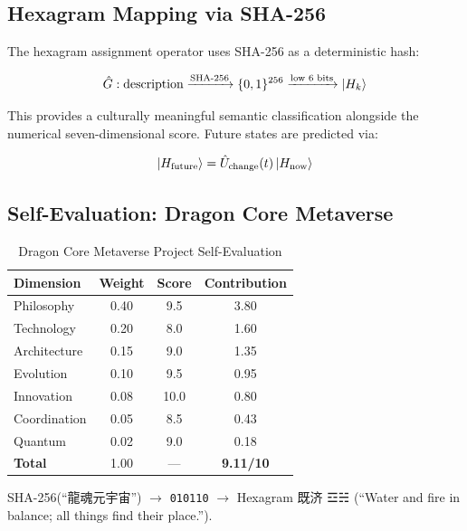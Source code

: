 \documentclass[conference]{IEEEtran}
\begin{document}
\subsection{Hexagram Mapping via SHA-256}

The hexagram assignment operator uses SHA-256 as
a deterministic hash:

\begin{equation}
  \hat{G} : \text{description}
  \xrightarrow{\text{SHA-256}}
  \{0,1\}^{256}
  \xrightarrow{\text{low 6 bits}}
  \ket{H_k}
  \label{eq:hexagram_hash}
\end{equation}

This provides a culturally meaningful semantic
classification alongside the numerical seven-dimensional
score. Future states are predicted via:

\begin{equation}
  \ket{H_{\text{future}}} = \hat{U}_{\text{change}}(t)\ket{H_{\text{now}}}
  \label{eq:hexagram_evolve}
\end{equation}

\subsection{Self-Evaluation: Dragon Core Metaverse}

\begin{table}[!ht]
\caption{Dragon Core Metaverse Project Self-Evaluation}
\label{tab:self_eval}
\centering
\begin{tabular}{lccc}
\toprule
\textbf{Dimension} & \textbf{Weight} & \textbf{Score} & \textbf{Contribution} \\
\midrule
Philosophy  & 0.40 & 9.5 & 3.80 \\
Technology  & 0.20 & 8.0 & 1.60 \\
Architecture & 0.15 & 9.0 & 1.35 \\
Evolution   & 0.10 & 9.5 & 0.95 \\
Innovation  & 0.08 & 10.0 & 0.80 \\
Coordination & 0.05 & 8.5 & 0.43 \\
Quantum     & 0.02 & 9.0 & 0.18 \\
\midrule
\textbf{Total} & 1.00 & --- & \textbf{9.11/10} \\
\bottomrule
\end{tabular}
\end{table}

SHA-256(``龍魂元宇宙'') $\to$ \texttt{010110}
$\to$ Hexagram 既济 ☲☵
(``Water and fire in balance; all things find their place.'').
\end{document}
